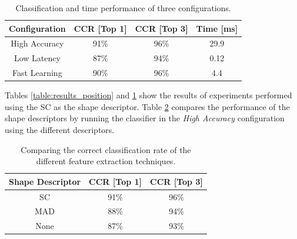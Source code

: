 \documentclass[10pt, conference, compsocconf]{IEEEtran}
\begin{document}
\begin{table}
\centering
\renewcommand{\arraystretch}{1.2}
\begin{tabular}{ | c | c | c | c |}
  \hline
  \textbf{Configuration}  & \textbf{CCR [Top 1]}  & \textbf{CCR [Top 3]} & \textbf{Time [ms]}\\
  \hline
  High Accuracy & 91\% & 96\% & 29.9 \\ 
  \hline
  Low Latency   & 87\% & 94\% & 0.12 \\
  \hline
  Fast Learning & 90\% & 96\% & 4.4 \\ 
  \hline
\end{tabular}
\caption{Classification and time performance of three configurations.}
\label{table:configurations} 
\end{table}

Tables \ref{table:results_position} and \ref{table:configurations} show the results of experiments performed using the SC as the shape descriptor.
Table \ref{table:features_comparison} compares the performance of the shape descriptors by running the classifier in the \emph{High Accuracy} configuration using the different descriptors.

\begin{table}
\centering
\renewcommand{\arraystretch}{1.2}
\begin{tabular}{ | c | c | c |}
\hline
	\textbf{Shape Descriptor}  & \textbf{CCR [Top 1]}  & \textbf{CCR [Top 3]} \\
	\hline 
	SC      & 91\% & 96\%  \\                
  	\hline
  	MAD     & 88\% & 94\% \\
  	\hline
  	None    & 87\% & 93\% \\
  	\hline
\end{tabular}
\caption{Comparing the correct classification rate of the different feature extraction techniques.}
\label{table:features_comparison} 
\end{table}
\end{document}
